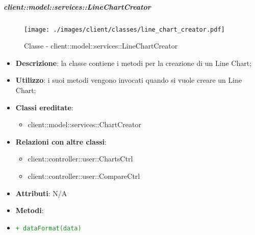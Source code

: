 		\subparagraph{client::model::services::LineChartCreator} %
		\label{subp:linechartcreator}
			\begin{figure}[htbp]
				\centering
				\centerline{\texttt{[image: ./images/client/classes/line\_chart\_creator.pdf]}}
				\caption{Classe - client::model::services::LineChartCreator}
			\end{figure}
			\begin{itemize}
				\item \textbf{Descrizione}: la classe contiene i metodi per la creazione di un Line Chart;
				\item \textbf{Utilizzo}: i suoi metodi vengono invocati quando si vuole creare un Line Chart;
				\item \textbf{Classi ereditate}:
					\begin{itemize}
						\item client::model::services::ChartCreator
					\end{itemize}
				\item \textbf{Relazioni con altre classi}:
					\begin{itemize}
						\item client::controller::user::ChartsCtrl
						\item client::controller::user::CompareCtrl
					\end{itemize}
				\item \textbf{Attributi}: N/A
				\item \textbf{Metodi}: 
					\item \textcolor{forestgreen}{\texttt{+ dataFormat(data)}}
			\end{itemize}


